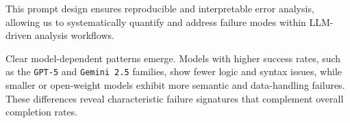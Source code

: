 \documentclass[aps,prd,reprint,superscriptaddress]{revtex4-2}
\begin{document}
This prompt design ensures reproducible and interpretable error analysis, allowing us to systematically quantify and address failure modes within LLM-driven analysis workflows. 

Clear model-dependent patterns emerge. Models with higher success rates, such as the \texttt{GPT-5} and \texttt{Gemini 2.5} families, show fewer logic and syntax issues, while smaller or open-weight models exhibit more semantic and data-handling failures. These differences reveal characteristic failure signatures that complement overall completion rates. 
\end{document}
